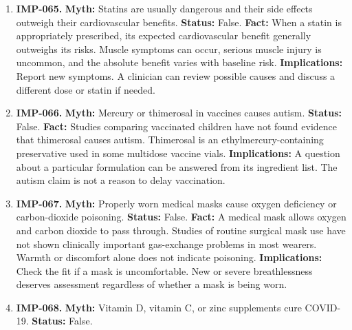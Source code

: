 \documentclass[11pt,oneside]{book}
\begin{document}
\begin{enumerate}[leftmargin=0pt,labelwidth=0pt,labelsep=0pt,itemindent=0pt]
\textbf{Implications:} Ask before starting aspirin for prevention. If aspirin was prescribed after a heart attack or stroke, discuss changes with the prescriber because that is a different indication.
\item[] \textbf{IMP-065.} \textbf{Myth:} Statins are usually dangerous and their side effects outweigh their cardiovascular benefits.\newline
\textbf{Status:} False.\newline
\textbf{Fact:} When a statin is appropriately prescribed, its expected cardiovascular benefit generally outweighs its risks. Muscle symptoms can occur, serious muscle injury is uncommon, and the absolute benefit varies with baseline risk. \cite{ref53}\newline
\textbf{Implications:} Report new symptoms. A clinician can review possible causes and discuss a different dose or statin if needed.
\item[] \textbf{IMP-066.} \textbf{Myth:} Mercury or thimerosal in vaccines causes autism.\newline
\textbf{Status:} False.\newline
\textbf{Fact:} Studies comparing vaccinated children have not found evidence that thimerosal causes autism. Thimerosal is an ethylmercury-containing preservative used in some multidose vaccine vials. \cite{ref2,ref54}\newline
\textbf{Implications:} A question about a particular formulation can be answered from its ingredient list. The autism claim is not a reason to delay vaccination.
\item[] \textbf{IMP-067.} \textbf{Myth:} Properly worn medical masks cause oxygen deficiency or carbon-dioxide poisoning.\newline
\textbf{Status:} False.\newline
\textbf{Fact:} A medical mask allows oxygen and carbon dioxide to pass through. Studies of routine surgical mask use have not shown clinically important gas-exchange problems in most wearers. Warmth or discomfort alone does not indicate poisoning. \cite{ref419,ref51}\newline
\textbf{Implications:} Check the fit if a mask is uncomfortable. New or severe breathlessness deserves assessment regardless of whether a mask is being worn.
\item[] \textbf{IMP-068.} \textbf{Myth:} Vitamin D, vitamin C, or zinc supplements cure COVID-19.\newline
\textbf{Status:} False.\newline

\end{enumerate}
\end{document}
